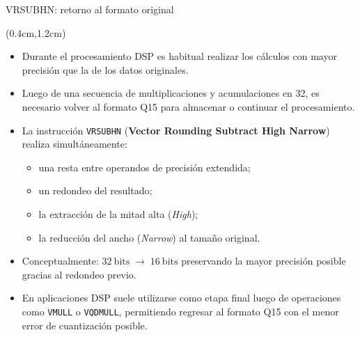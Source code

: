 \begin{frame}{VRSUBHN: retorno al formato original}
 \begin{textblock*}{\textwidth}(0.4cm,1.2cm)
  \begin{itemize}[<+->]\justifying
   \item Durante el procesamiento DSP es habitual realizar los cálculos con mayor precisión que la de los datos originales.
   \item Luego de una secuencia de multiplicaciones y acumulaciones en \SI{32}{\bit}, es necesario volver al formato Q15 para almacenar o continuar el procesamiento.
   \item La instrucción \texttt{VRSUBHN} (\textbf{Vector Rounding Subtract High Narrow}) realiza simultáneamente:
   \begin{itemize}
    \item una resta entre operandos de precisión extendida;
    \item un redondeo del resultado;
    \item la extracción de la mitad alta (\textit{High});
    \item la reducción del ancho (\textit{Narrow}) al tamaño original.
   \end{itemize}
   \item Conceptualmente:
$ \boxed{
32\ \text{bits}
\;\longrightarrow\;
16\ \text{bits}
}
$
   preservando la mayor precisión posible gracias al redondeo previo.
   \item En aplicaciones DSP suele utilizarse como etapa final luego de operaciones como \texttt{VMULL} o \texttt{VQDMULL}, permitiendo regresar al formato Q15 con el menor error de cuantización posible.
  \end{itemize}
 \end{textblock*}
\end{frame}

